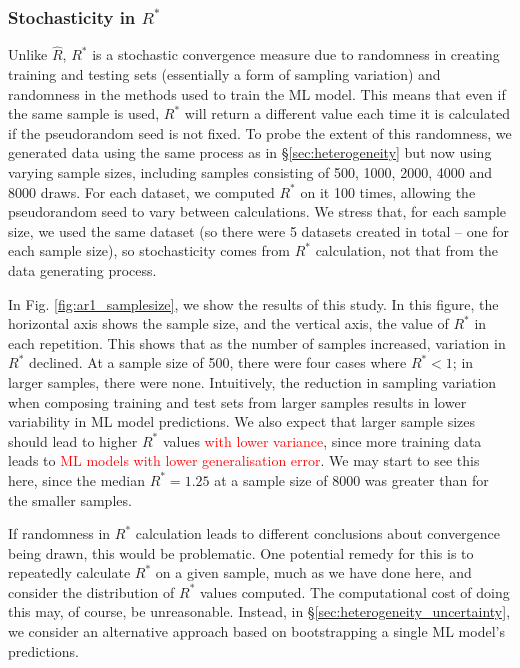 \documentclass{article}
\begin{document}
\subsubsection{Stochasticity in $R^*$}\label{sec:heterogeneity_stochasticity}
Unlike $\widehat{R}$, $R^*$ is a stochastic convergence measure due to randomness in creating training and testing sets (essentially a form of sampling variation) and randomness in the methods used to train the ML model. This means that even if the same sample is used, $R^*$ will return a different value each time it is calculated if the pseudorandom seed is not fixed. To probe the extent of this randomness, we generated data using the same process as in \S\ref{sec:heterogeneity} but now using varying sample sizes, including samples consisting of 500, 1000, 2000, 4000 and 8000 draws. For each dataset, we computed $R^*$ on it 100 times, allowing the pseudorandom seed to vary between calculations. We stress that, for each sample size, we used the same dataset (so there were 5 datasets created in total -- one for each sample size), so stochasticity comes from $R^*$ calculation, not that from the data generating process.

In Fig. \ref{fig:ar1_samplesize}, we show the results of this study. In this figure, the horizontal axis shows the sample size, and the vertical axis, the value of $R^*$ in each repetition. This shows that as the number of samples increased, variation in $R^*$ declined. At a sample size of 500, there were four cases where $R^*<1$; in larger samples, there were none. Intuitively, the reduction in sampling variation when composing training and test sets from larger samples results in lower variability in ML model predictions. We also expect that larger sample sizes should lead to higher $R^*$ values \textcolor{red}{with lower variance}, since more training data leads to \textcolor{red}{ML models with lower generalisation error}. We may start to see this here, since the median $R^*=1.25$ at a sample size of 8000 was greater than for the smaller samples. 

If randomness in $R^*$ calculation leads to different conclusions about convergence being drawn, this would be problematic. One potential remedy for this is to repeatedly calculate $R^*$ on a given sample, much as we have done here, and consider the distribution of $R^*$ values computed. The computational cost of doing this may, of course, be unreasonable. Instead, in \S\ref{sec:heterogeneity_uncertainty}, we consider an alternative approach based on bootstrapping a single ML model's predictions.
\end{document}
